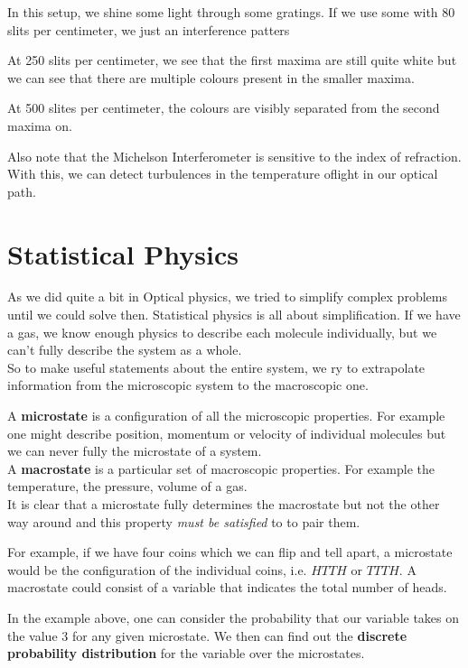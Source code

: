 \begin{demo}
	In this setup, we shine some light through some gratings. If we use some with 80 slits per centimeter, we just an interference patters

	At 250 slits per centimeter, we see that the first maxima are still quite white but we can see that there are multiple colours present in the smaller maxima.

	At 500 slites per centimeter, the colours are visibly separated from the second maxima on.
\end{demo}
Also note that the Michelson Interferometer is sensitive to the index of refraction. With this, we can detect turbulences in the temperature oflight in our optical path.




\section{Statistical Physics}
As we did quite a bit in Optical physics, we tried to simplify complex problems until we could solve then. Statistical physics is all about simplification. If we have a gas, we know enough physics to describe each molecule individually, but we can't fully describe the system as a whole.\\
So to make useful statements about the entire system, we ry to extrapolate information from the microscopic system to the macroscopic one.
\begin{definition}[]
	A \textbf{microstate} is a configuration of all the microscopic properties. For example one might describe position, momentum or velocity of individual molecules but we can never fully the microstate of a system.\\
	A \textbf{macrostate} is a particular set of macroscopic properties. For example the temperature, the pressure, volume of a gas.\\
	It is clear that a microstate fully determines the macrostate but not the other way around and this property \emph{must be satisfied} to to pair them.
\end{definition}

For example, if we have four coins which we can flip and tell apart, a microstate would be the configuration of the individual coins, i.e. $HTTH$ or $TTTH$. A macrostate could consist of a variable that indicates the total number of heads.

In the example above, one can consider the probability that our variable takes on the value $3$ for any given microstate. We then can find out the \textbf{discrete probability distribution} for the variable over the microstates.

